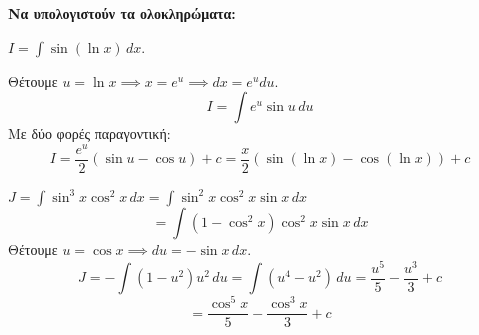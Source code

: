\begin{thema}[label=\bf\large{ΘΕΜΑ \textcolor{black}{\arabic*}}]
\item %
\textbf{Να υπολογιστούν τα ολοκληρώματα:}

\begin{rlist}
    \item $I = \int \sin(\ln x) \, dx$.
    
    Θέτουμε $u = \ln x \implies x = e^u \implies dx = e^u du$.
    \[ I = \int e^u \sin u \, du \]
    Με δύο φορές παραγοντική:
    \[ I = \frac{e^u}{2}(\sin u - \cos u) + c = \frac{x}{2}(\sin(\ln x) - \cos(\ln x)) + c \]

    \item $J = \int \sin^3 x \cos^2 x \, dx = \int \sin^2 x \cos^2 x \sin x \, dx$
    \[ = \int (1-\cos^2 x) \cos^2 x \sin x \, dx \]
    Θέτουμε $u = \cos x \implies du = -\sin x \, dx$.
    \[ J = -\int (1-u^2)u^2 \, du = \int (u^4 - u^2) \, du = \frac{u^5}{5} - \frac{u^3}{3} + c \]
    \[ = \frac{\cos^5 x}{5} - \frac{\cos^3 x}{3} + c \]
\end{rlist}

\end{thema}


